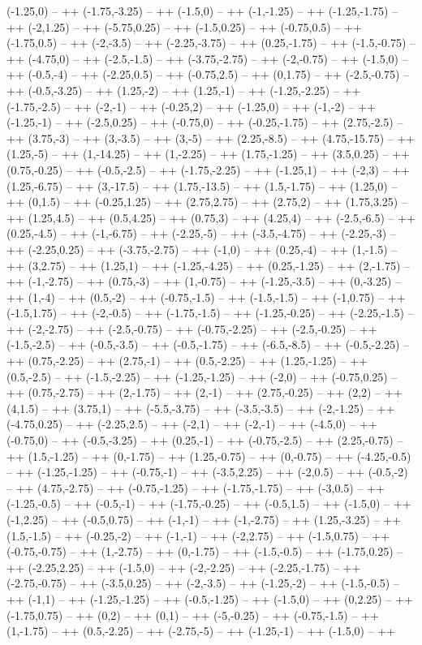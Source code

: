 (-1.25,0) -- ++ (-1.75,-3.25) -- ++ (-1.5,0) -- ++ (-1,-1.25) -- ++ (-1.25,-1.75) -- ++ (-2,1.25) -- ++ (-5.75,0.25) -- ++ (-1.5,0.25) -- ++ (-0.75,0.5) -- ++ (-1.75,0.5) -- ++ (-2,-3.5) -- ++ (-2.25,-3.75) -- ++ (0.25,-1.75) -- ++ (-1.5,-0.75) -- ++ (-4.75,0) -- ++ (-2.5,-1.5) -- ++ (-3.75,-2.75) -- ++ (-2,-0.75) -- ++ (-1.5,0) -- ++ (-0.5,-4) -- ++ (-2.25,0.5) -- ++ (-0.75,2.5) -- ++ (0,1.75) -- ++ (-2.5,-0.75) -- ++ (-0.5,-3.25) -- ++ (1.25,-2) -- ++ (1.25,-1) -- ++ (-1.25,-2.25) -- ++ (-1.75,-2.5) -- ++ (-2,-1) -- ++ (-0.25,2) -- ++ (-1.25,0) -- ++ (-1,-2) -- ++ (-1.25,-1) -- ++ (-2.5,0.25) -- ++ (-0.75,0) -- ++ (-0.25,-1.75) -- ++ (2.75,-2.5) -- ++ (3.75,-3) -- ++ (3,-3.5) -- ++ (3,-5) -- ++ (2.25,-8.5) -- ++ (4.75,-15.75) -- ++ (1.25,-5) -- ++ (1,-14.25) -- ++ (1,-2.25) -- ++ (1.75,-1.25) -- ++ (3.5,0.25) -- ++ (0.75,-0.25) -- ++ (-0.5,-2.5) -- ++ (-1.75,-2.25) -- ++ (-1.25,1) -- ++ (-2,3) -- ++ (1.25,-6.75) -- ++ (3,-17.5) -- ++ (1.75,-13.5) -- ++ (1.5,-1.75) -- ++ (1.25,0) -- ++ (0,1.5) -- ++ (-0.25,1.25) -- ++ (2.75,2.75) -- ++ (2.75,2) -- ++ (1.75,3.25) -- ++ (1.25,4.5) -- ++ (0.5,4.25) -- ++ (0.75,3) -- ++ (4.25,4) -- ++ (-2.5,-6.5) -- ++ (0.25,-4.5) -- ++ (-1,-6.75) -- ++ (-2.25,-5) -- ++ (-3.5,-4.75) -- ++ (-2.25,-3) -- ++ (-2.25,0.25) -- ++ (-3.75,-2.75) -- ++ (-1,0) -- ++ (0.25,-4) -- ++ (1,-1.5) -- ++ (3,2.75) -- ++ (1.25,1) -- ++ (-1.25,-4.25) -- ++ (0.25,-1.25) -- ++ (2,-1.75) -- ++ (-1,-2.75) -- ++ (0.75,-3) -- ++ (1,-0.75) -- ++ (-1.25,-3.5) -- ++ (0,-3.25) -- ++ (1,-4) -- ++ (0.5,-2) -- ++ (-0.75,-1.5) -- ++ (-1.5,-1.5) -- ++ (-1,0.75) -- ++ (-1.5,1.75) -- ++ (-2,-0.5) -- ++ (-1.75,-1.5) -- ++ (-1.25,-0.25) -- ++ (-2.25,-1.5) -- ++ (-2,-2.75) -- ++ (-2.5,-0.75) -- ++ (-0.75,-2.25) -- ++ (-2.5,-0.25) -- ++ (-1.5,-2.5) -- ++ (-0.5,-3.5) -- ++ (-0.5,-1.75) -- ++ (-6.5,-8.5) -- ++ (-0.5,-2.25) -- ++ (0.75,-2.25) -- ++ (2.75,-1) -- ++ (0.5,-2.25) -- ++ (1.25,-1.25) -- ++ (0.5,-2.5) -- ++ (-1.5,-2.25) -- ++ (-1.25,-1.25) -- ++ (-2,0) -- ++ (-0.75,0.25) -- ++ (0.75,-2.75) -- ++ (2,-1.75) -- ++ (2,-1) -- ++ (2.75,-0.25) -- ++ (2,2) -- ++ (4,1.5) -- ++ (3.75,1) -- ++ (-5.5,-3.75) -- ++ (-3.5,-3.5) -- ++ (-2,-1.25) -- ++ (-4.75,0.25) -- ++ (-2.25,2.5) -- ++ (-2,1) -- ++ (-2,-1) -- ++ (-4.5,0) -- ++ (-0.75,0) -- ++ (-0.5,-3.25) -- ++ (0.25,-1) -- ++ (-0.75,-2.5) -- ++ (2.25,-0.75) -- ++ (1.5,-1.25) -- ++ (0,-1.75) -- ++ (1.25,-0.75) -- ++ (0,-0.75) -- ++ (-4.25,-0.5) -- ++ (-1.25,-1.25) -- ++ (-0.75,-1) -- ++ (-3.5,2.25) -- ++ (-2,0.5) -- ++ (-0.5,-2) -- ++ (4.75,-2.75) -- ++ (-0.75,-1.25) -- ++ (-1.75,-1.75) -- ++ (-3,0.5) -- ++ (-1.25,-0.5) -- ++ (-0.5,-1) -- ++ (-1.75,-0.25) -- ++ (-0.5,1.5) -- ++ (-1.5,0) -- ++ (-1,2.25) -- ++ (-0.5,0.75) -- ++ (-1,-1) -- ++ (-1,-2.75) -- ++ (1.25,-3.25) -- ++ (1.5,-1.5) -- ++ (-0.25,-2) -- ++ (-1,-1) -- ++ (-2,2.75) -- ++ (-1.5,0.75) -- ++ (-0.75,-0.75) -- ++ (1,-2.75) -- ++ (0,-1.75) -- ++ (-1.5,-0.5) -- ++ (-1.75,0.25) -- ++ (-2.25,2.25) -- ++ (-1.5,0) -- ++ (-2,-2.25) -- ++ (-2.25,-1.75) -- ++ (-2.75,-0.75) -- ++ (-3.5,0.25) -- ++ (-2,-3.5) -- ++ (-1.25,-2) -- ++ (-1.5,-0.5) -- ++ (-1,1) -- ++ (-1.25,-1.25) -- ++ (-0.5,-1.25) -- ++ (-1.5,0) -- ++ (0,2.25) -- ++ (-1.75,0.75) -- ++ (0,2) -- ++ (0,1) -- ++ (-5,-0.25) -- ++ (-0.75,-1.5) -- ++ (1,-1.75) -- ++ (0.5,-2.25) -- ++ (-2.75,-5) -- ++ (-1.25,-1) -- ++ (-1.5,0) -- ++ 